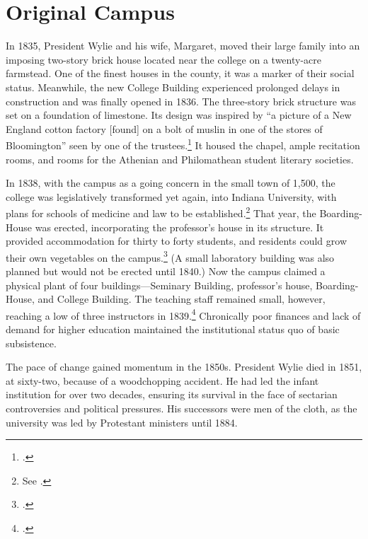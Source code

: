 \documentclass[
  american,
  letterpaper,
]{scrreprt}
\begin{document}
\section{Original Campus}\label{original-campus}

In 1835, President Wylie and his wife, Margaret, moved their large
family into an imposing two-story brick house located near the college
on a twenty-acre farmstead. One of the finest houses in the county, it
was a marker of their social status. Meanwhile, the new College Building
experienced prolonged delays in construction and was finally opened in
1836. The three-story brick structure was set on a foundation of
limestone. Its design was inspired by ``a picture of a New England
cotton factory {[}found{]} on a bolt of muslin in one of the stores of
Bloomington'' seen by one of the trustees.\footnote{.} It
housed the chapel, ample recitation rooms, and rooms for the Athenian
and Philomathean student literary societies.

In 1838, with the campus as a going concern in the small town of 1,500,
the college was legislatively transformed yet again, into Indiana
University, with plans for schools of medicine and law to be
established.\footnote{See .} That year, the
Boarding-House was erected, incorporating the professor's house in its
structure. It provided accommodation for thirty to forty students, and
residents could grow their own vegetables on the campus.\footnote{.} (A small laboratory building was also planned but would
not be erected until 1840.) Now the campus claimed a physical plant of
four buildings---Seminary Building, professor's house, Boarding-House,
and College Building. The teaching staff remained small, however,
reaching a low of three instructors in 1839.\footnote{.} Chronically poor
finances and lack of demand for higher education maintained the
institutional status quo of basic subsistence.

The pace of change gained momentum in the 1850s. President Wylie died in
1851, at sixty-two, because of a woodchopping accident. He had led the
infant institution for over two decades, ensuring its survival in the
face of sectarian controversies and political pressures. His successors
were men of the cloth, as the university was led by Protestant ministers
until 1884.
\end{document}
